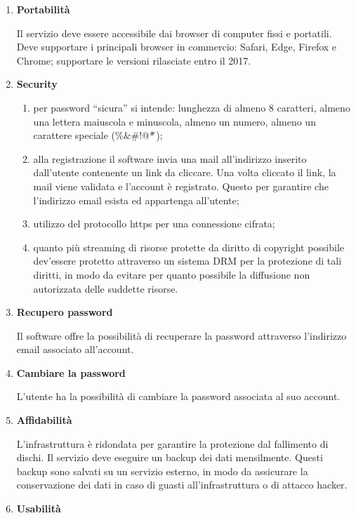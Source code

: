 \documentclass[a4paper,12pt]{article}
\begin{document}
\begin{enumerate}[label=\textbf{RNF\arabic*}\;, ref=\textbf{RNF\arabic*}]
    \item \label{portabilità} \textbf{Portabilità}
    
    Il servizio deve essere accessibile dai browser di computer fissi e portatili. Deve supportare i principali browser in commercio: Safari, Edge, Firefox e Chrome; supportare le versioni rilasciate entro il 2017.
    \item \label{security} \textbf{Security}
    
    \begin{enumerate}[label=\textbf{\alph*}, ref=\textbf{RNF2\alph*}, itemsep=0.5em]
        \item \label{password sicura} per password “sicura” si intende: lunghezza di almeno 8 caratteri, almeno una lettera maiuscola e minuscola, almeno un numero, almeno un carattere speciale (\%\&\#!@*\^\,);
        \item \label{email di verifica} alla registrazione il software invia una mail all’indirizzo inserito dall’utente contenente un link da cliccare. Una volta cliccato il link, la mail viene validata e l’account è registrato. Questo per garantire che l’indirizzo email esista ed appartenga all’utente;
        \item \label{protocollo https} utilizzo del protocollo https per una connessione cifrata;
        \item \label{DRM} quanto più streaming di risorse protette da diritto di copyright possibile dev’essere protetto attraverso un sistema DRM per la protezione di tali diritti, in modo da evitare per quanto possibile la diffusione non autorizzata delle suddette risorse.
    \end{enumerate}
    \item \label{recupero password nf} \textbf{Recupero password}
    
    Il software offre la possibilità di recuperare la password attraverso l’indirizzo email associato all’account.
    \item \label{cambiare password} \textbf{Cambiare la password}
    
    L'utente ha la possibilità di cambiare la password associata al suo account.
    \item \label{affidabilità} \textbf{Affidabilità}
    
    L’infrastruttura è ridondata per garantire la protezione dal fallimento di dischi. Il servizio deve eseguire un backup dei dati mensilmente. Questi backup sono salvati su un servizio esterno, in modo da assicurare la conservazione dei dati in caso di guasti all’infrastruttura o di attacco hacker.
    \item \label{usabilità} \textbf{Usabilità}
    

\end{enumerate}
\end{document}
